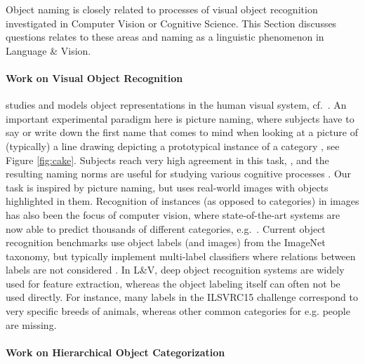 
Object naming is closely related to processes of visual object recognition investigated in Computer Vision or Cognitive Science.
This Section discusses questions relates to these areas and naming as a linguistic phenomenon in Language \& Vision.



\paragraph{Work on Visual Object Recognition} studies and models object representations in the human visual system, cf.\ \cite{regan2000human,rossion2004revisiting}. 
An important experimental paradigm here is picture naming, where subjects have to say or write down the first name that comes to mind when looking at a picture of (typically) a line drawing depicting a prototypical instance of a category \cite{snodgrass}, see Figure \ref{fig:cake}.
Subjects reach very high agreement in this task, \cite{rossion2004revisiting}, and the resulting naming norms are useful for studying various cognitive processes \cite{humphreys1988cascade}.
Our task is inspired by picture naming, but uses real-world images with objects highlighted in them.
Recognition of instances (as opposed to categories) in images has also been the focus of computer vision, where state-of-the-art systems are now able to predict thousands of different categories, e.g.\  . 
Current object recognition benchmarks use object labels (and images) from the ImageNet \cite{imagenet_cvpr09} taxonomy, but typically implement multi-label classifiers where relations between labels are not considered \cite{ILSVRC15}. 
In L\&V,  deep object recognition systems are widely used for feature extraction, whereas the object labeling itself can often not be used directly. For instance, many labels in the ILSVRC15 challenge correspond to very specific breeds of animals, whereas other common categories  for e.g. people are missing.


\paragraph{Work on Hierarchical Object Categorization} 

